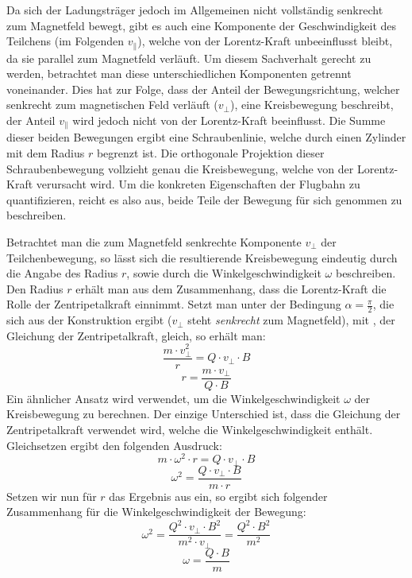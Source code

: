 Da sich der Ladungstr\"ager jedoch im Allgemeinen nicht vollst\"andig senkrecht zum Magnetfeld bewegt, gibt es auch eine Komponente
der Geschwindigkeit des Teilchens (im Folgenden \(v_\parallel\)), welche von der Lorentz-Kraft unbeeinflusst bleibt, da sie parallel zum
Magnetfeld verl\"auft.
Um diesem Sachverhalt gerecht zu werden, betrachtet man diese unterschiedlichen Komponenten getrennt voneinander. Dies hat zur
Folge, dass der Anteil der Bewegungsrichtung, welcher senkrecht zum magnetischen Feld verl\"auft (\(v_\perp\)), eine Kreisbewegung
beschreibt,
der Anteil \(v_\parallel\) wird jedoch nicht von der Lorentz-Kraft beeinflusst. 
Die Summe dieser beiden Bewegungen ergibt
eine Schraubenlinie, welche durch einen Zylinder mit dem Radius \(r\) begrenzt ist. Die orthogonale Projektion dieser
Schraubenbewegung vollzieht genau die Kreisbewegung, welche von der Lorentz-Kraft verursacht wird.
Um die konkreten Eigenschaften der Flugbahn zu quantifizieren, reicht es also aus, beide Teile der Bewegung f\"ur sich genommen
zu beschreiben. 

Betrachtet man die zum Magnetfeld senkrechte Komponente \(v_\perp\) der Teilchenbewegung, so l\"asst sich die resultierende Kreisbewegung
eindeutig durch die Angabe des Radius \(r\), sowie durch die Winkelgeschwindigkeit \(\omega\) beschreiben. Den Radius \(r\) erh\"alt
man aus dem Zusammenhang, dass die Lorentz-Kraft die Rolle der Zentripetalkraft einnimmt. Setzt man  unter der
Bedingung \(\alpha = \frac{\pi}{2}\), die sich aus der Konstruktion ergibt (\(v_\perp\) steht \textit{senkrecht} zum Magnetfeld),
mit , der Gleichung der Zentripetalkraft, gleich, so erh\"alt man:
\begin{equation*}
  \frac{m \cdot v_\perp^2}{r} = Q \cdot v_\perp \cdot B
\end{equation*}
\begin{equation}
  \label{eq:radius}
  r = \frac{m \cdot v_\perp}{Q \cdot B}
\end{equation}
Ein \"ahnlicher Ansatz wird verwendet, um die Winkelgeschwindigkeit \(\omega\) der Kreisbewegung zu berechnen. Der einzige Unterschied
ist, dass die Gleichung der Zentripetalkraft verwendet wird, welche die Winkelgeschwindigkeit enth\"alt. Gleichsetzen ergibt den
folgenden Ausdruck:
\begin{equation*}
  m \cdot \omega^2 \cdot r = Q \cdot v_\perp \cdot B
\end{equation*}
\begin{equation*}
  \omega^2 = \frac{Q \cdot v_\perp \cdot B}{m \cdot r}
\end{equation*}
Setzen wir nun f\"ur \(r\) das Ergebnis aus  ein, so ergibt sich folgender Zusammenhang f\"ur die
Winkelgeschwindigkeit der Bewegung:
\begin{equation*}
  \omega^2 = \frac{Q^2 \cdot v_\perp \cdot B^2}{m^2 \cdot v_\perp} = \frac{Q^2 \cdot B^2}{m^2}
\end{equation*}
\begin{equation}
  \label{eq:omega}
  \omega = \frac{Q \cdot B}{m}
\end{equation}

